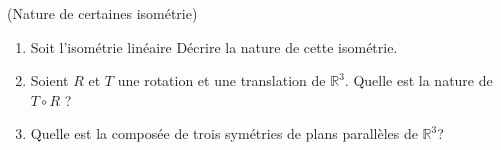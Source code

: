 \documentclass[a4paper,12pt,reqno]{amsart}
\begin{document}
\begin{exo} (Nature de certaines isométrie)
  \begin{enumerate}
    \item Soit l'isométrie linéaire%
      \scalebox{.7}{
        $
          \begin{pmatrix}
            0 & 0 & 1 \\
            1 & 0 & 0 \\
            0 & 1 & 0
          \end{pmatrix}
        $.
      }
      Décrire la nature de cette isométrie.
    \item Soient $R$ et $T$ une rotation et une translation de $\mathbb{R}^{3}$. Quelle est la nature de $T \circ R$ ?
    \item Quelle est la composée de trois symétries de plans parallèles de $\mathbb{R}^{3}$?
  \end{enumerate}
\end{exo}
\end{document}
